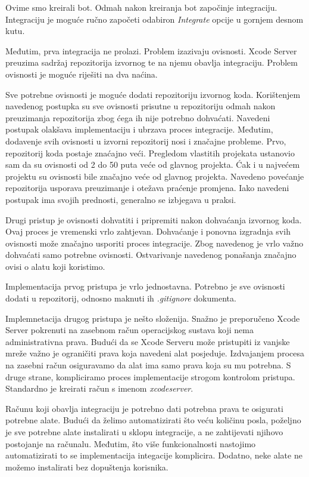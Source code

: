 \documentclass[times, utf8, diplomski, numeric]{fer}
\begin{document}
\begin{appendices}
Ovime smo kreirali bot. Odmah nakon kreiranja bot započinje integraciju. Integraciju je moguće ručno započeti odabiron \textit{Integrate} opcije u gornjem desnom kutu.

Međutim, prva integracija ne prolazi. Problem izazivaju ovisnosti. Xcode Server preuzima sadržaj repozitorija izvornog te na njemu obavlja integraciju. Problem ovisnosti je moguće riješiti na dva naćina.

Sve potrebne ovisnosti je moguće dodati repozitoriju izvornog koda. Korištenjem navedenog postupka su sve ovisnosti prisutne u repozitoriju odmah nakon preuzimanja repozitorija zbog ćega ih nije potrebno dohvaćati. Navedeni postupak olakšava implementaciju i ubrzava proces integracije. Međutim, dodavenje svih ovisnosti u izvorni repozitorij nosi i značajne probleme. Prvo, repozitorij koda postaje znaćajno veći. Pregledom vlastitih projekata ustanovio sam da su ovisnosti od 2 do 50 puta veće od glavnog projekta. Ćak i u najvećem projektu su ovisnosti bile značajno veće od glavnog projekta. Navedeno povećanje repozitorija usporava preuzimanje i otežava praćenje promjena. Iako navedeni postupak ima svojih prednosti, generalno se izbjegava u praksi.

Drugi pristup je ovisnosti dohvatiti i pripremiti nakon dohvaćanja izvornog koda. Ovaj proces je vremenski vrlo zahtjevan. Dohvaćanje i ponovna izgradnja svih ovisnosti može značajno usporiti proces integracije. Zbog navedenog je vrlo važno dohvaćati samo potrebne ovisnosti. Ostvarivanje navedenog ponašanja značajno ovisi o alatu koji koristimo.

Implementacija prvog pristupa je vrlo jednostavna. Potrebno je sve ovisnosti dodati u repozitorij, odnosno maknuti ih \textit{.gitignore} dokumenta.

Implemnetacija drugog pristupa je nešto složenija. Snažno je preporučeno Xcode Server pokrenuti na zasebnom račun operacijskog sustava koji nema administrativna prava. Budući da se Xcode Serveru može pristupiti iz vanjske mreže važno je ograničiti prava koja navedeni alat posjeduje. Izdvajanjem procesa na zasebni račun osiguravamo da alat ima samo prava koja su mu potrebna. S druge strane, kompliciramo proces implementacije strogom kontrolom pristupa. Standardno je kreirati račun s imenom \textit{xcodeserver}.

Računu koji obavlja integraciju je potrebno dati potrebna prava te osigurati potrebne alate. Budući da želimo automatizirati što veću količinu posla, poželjno je sve potrebne alate instalirati u sklopu integracije, a ne zahtijevati njihovo postojanje na računalu. Međutim, što više funkcionalnosti nastojimo automatizirati to se implementacija integacije komplicira. Dodatno, neke alate ne možemo instalirati bez dopuštenja korisnika.


\end{appendices}
\end{document}
